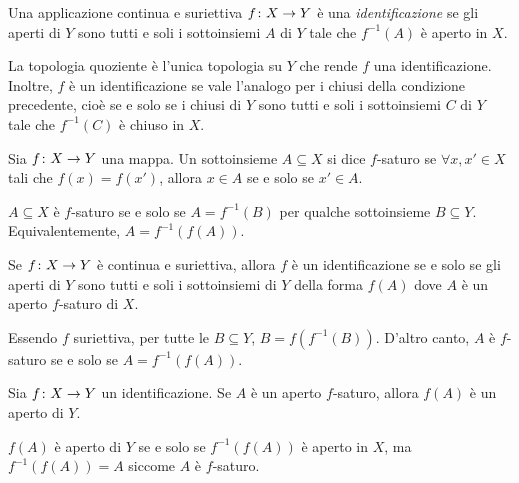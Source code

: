 \documentclass[a4paper]{article}
\begin{document}
\begin{snippetdefinition}{}
    Una applicazione continua e suriettiva \(f\colon X \to Y\)
    è una \emph{identificazione} se gli aperti di \(Y\) sono tutti e soli i sottoinsiemi
    \(A\) di \(Y\) tale che \(f^{-1}(A)\) è aperto in \(X\).
\end{snippetdefinition}

La topologia quoziente è l'unica topologia su \(Y\) che rende \(f\) una identificazione.
Inoltre, \(f\) è un identificazione se vale l'analogo per i chiusi della condizione precedente,
cioè se e solo se i chiusi di \(Y\) sono tutti e soli i sottoinsiemi \(C\) di \(Y\)
tale che \(f^{-1}(C)\) è chiuso in \(X\).

\begin{snippetdefinition}{}
    Sia \(f \colon X \to Y\) una mappa.
    Un sottoinsieme \(A \subseteq X\) si dice
    \(f\)-saturo se \(\forall x,x' \in X\) tali che \(f(x) = f(x')\),
    allora \(x\in A\) se e solo se \(x'\in A\).
\end{snippetdefinition}

\(A \subseteq X\) è \(f\)-saturo se e solo se \(A = f^{-1}(B)\)
per qualche sottoinsieme \(B \subseteq Y\).
Equivalentemente, \(A = f^{-1}(f(A))\).

\begin{snippetproposition}{}
    Se \(f\colon X \to Y\) è continua e suriettiva, allora \(f\)
    è un identificazione
    se e solo se gli aperti di \(Y\) sono tutti e soli
    i sottoinsiemi di \(Y\) della forma \(f(A)\) dove \(A\) è un aperto \(f\)-saturo di \(X\).
\end{snippetproposition}

\begin{snippetproof}{}
    Essendo \(f\) suriettiva, per tutte le \(B \subseteq Y\),
    \(B = f(f^{-1}(B))\).
    D'altro canto, \(A\) è \(f\)-saturo se e solo se \(A = f^{-1}(f(A))\).
\end{snippetproof}

\begin{snippetproposition}{}
    Sia \(f \colon X \to Y\) un identificazione.
    Se \(A\) è un aperto \(f\)-saturo, allora \(f(A)\)
    è un aperto di \(Y\).
\end{snippetproposition}

\begin{snippetproof}{}
    \(f(A)\) è aperto di \(Y\) se e solo se
    \(f^{-1}(f(A))\) è aperto in \(X\),
    ma \(f^{-1}(f(A)) = A\) siccome \(A\) è \(f\)-saturo.
\end{snippetproof}
\end{document}
